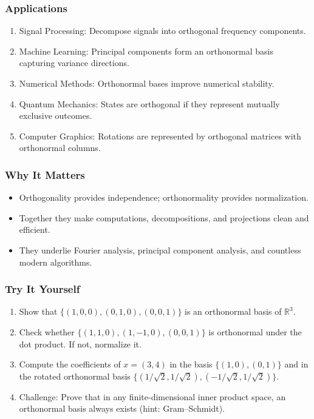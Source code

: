 \documentclass[
  letterpaper,
  DIV=11,
  numbers=noendperiod]{scrreprt}
\providecommand{\tightlist}{%
  \setlength{\itemsep}{0pt}\setlength{\parskip}{0pt}}
\begin{document}
\subsubsection{Applications}\label{applications-34}

\begin{enumerate}
\def\labelenumi{\arabic{enumi}.}
\tightlist
\item
  Signal Processing: Decompose signals into orthogonal frequency
  components.
\item
  Machine Learning: Principal components form an orthonormal basis
  capturing variance directions.
\item
  Numerical Methods: Orthonormal bases improve numerical stability.
\item
  Quantum Mechanics: States are orthogonal if they represent mutually
  exclusive outcomes.
\item
  Computer Graphics: Rotations are represented by orthogonal matrices
  with orthonormal columns.
\end{enumerate}

\subsubsection{Why It Matters}\label{why-it-matters-68}

\begin{itemize}
\tightlist
\item
  Orthogonality provides independence; orthonormality provides
  normalization.
\item
  Together they make computations, decompositions, and projections clean
  and efficient.
\item
  They underlie Fourier analysis, principal component analysis, and
  countless modern algorithms.
\end{itemize}

\subsubsection{Try It Yourself}\label{try-it-yourself-71}

\begin{enumerate}
\def\labelenumi{\arabic{enumi}.}
\tightlist
\item
  Show that \(\{(1,0,0), (0,1,0), (0,0,1)\}\) is an orthonormal basis of
  \(\mathbb{R}^3\).
\item
  Check whether \(\{(1,1,0), (1,-1,0), (0,0,1)\}\) is orthonormal under
  the dot product. If not, normalize it.
\item
  Compute the coefficients of \(x=(3,4)\) in the basis
  \(\{(1,0), (0,1)\}\) and in the rotated orthonormal basis
  \(\{(1/\sqrt{2}, 1/\sqrt{2}), (-1/\sqrt{2}, 1/\sqrt{2})\}\).
\item
  Challenge: Prove that in any finite-dimensional inner product space,
  an orthonormal basis always exists (hint: Gram--Schmidt).
\end{enumerate}
\end{document}
